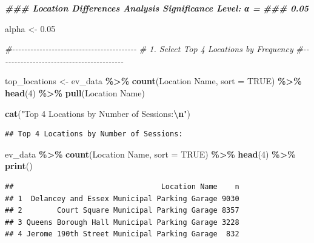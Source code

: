 \documentclass[
  12pt,
]{article}
\newenvironment{Shaded}{\begin{snugshade}}{\end{snugshade}}
\newcommand{\AttributeTok}[1]{\textcolor[rgb]{0.13,0.29,0.53}{#1}}
\newcommand{\CommentTok}[1]{\textcolor[rgb]{0.56,0.35,0.01}{\textit{#1}}}
\newcommand{\ConstantTok}[1]{\textcolor[rgb]{0.56,0.35,0.01}{#1}}
\newcommand{\DecValTok}[1]{\textcolor[rgb]{0.00,0.00,0.81}{#1}}
\newcommand{\DocumentationTok}[1]{\textcolor[rgb]{0.56,0.35,0.01}{\textbf{\textit{#1}}}}
\newcommand{\FloatTok}[1]{\textcolor[rgb]{0.00,0.00,0.81}{#1}}
\newcommand{\FunctionTok}[1]{\textcolor[rgb]{0.13,0.29,0.53}{\textbf{#1}}}
\newcommand{\NormalTok}[1]{#1}
\newcommand{\OtherTok}[1]{\textcolor[rgb]{0.56,0.35,0.01}{#1}}
\newcommand{\SpecialCharTok}[1]{\textcolor[rgb]{0.81,0.36,0.00}{\textbf{#1}}}
\newcommand{\StringTok}[1]{\textcolor[rgb]{0.31,0.60,0.02}{#1}}
\begin{document}
\begin{Shaded}
\begin{Highlighting}[]
\DocumentationTok{\#\#\# Location Differences Analysis Significance Level: α =}
\DocumentationTok{\#\#\# 0.05}

\NormalTok{alpha }\OtherTok{\textless{}{-}} \FloatTok{0.05}

\CommentTok{\#{-}{-}{-}{-}{-}{-}{-}{-}{-}{-}{-}{-}{-}{-}{-}{-}{-}{-}{-}{-}{-}{-}{-}{-}{-}{-}{-}{-}{-}{-}{-}{-}{-}{-}{-}{-}{-}{-}{-}{-}{-}}
\CommentTok{\# 1. Select Top 4 Locations by Frequency}
\CommentTok{\#{-}{-}{-}{-}{-}{-}{-}{-}{-}{-}{-}{-}{-}{-}{-}{-}{-}{-}{-}{-}{-}{-}{-}{-}{-}{-}{-}{-}{-}{-}{-}{-}{-}{-}{-}{-}{-}{-}{-}{-}{-}}

\NormalTok{top\_locations }\OtherTok{\textless{}{-}}\NormalTok{ ev\_data }\SpecialCharTok{\%\textgreater{}\%}
    \FunctionTok{count}\NormalTok{(}\StringTok{\textasciigrave{}}\AttributeTok{Location Name}\StringTok{\textasciigrave{}}\NormalTok{, }\AttributeTok{sort =} \ConstantTok{TRUE}\NormalTok{) }\SpecialCharTok{\%\textgreater{}\%}
    \FunctionTok{head}\NormalTok{(}\DecValTok{4}\NormalTok{) }\SpecialCharTok{\%\textgreater{}\%}
    \FunctionTok{pull}\NormalTok{(}\StringTok{\textasciigrave{}}\AttributeTok{Location Name}\StringTok{\textasciigrave{}}\NormalTok{)}

\FunctionTok{cat}\NormalTok{(}\StringTok{"Top 4 Locations by Number of Sessions:}\SpecialCharTok{\textbackslash{}n}\StringTok{"}\NormalTok{)}
\end{Highlighting}
\end{Shaded}

\begin{verbatim}
## Top 4 Locations by Number of Sessions:
\end{verbatim}

\begin{Shaded}
\begin{Highlighting}[]
\NormalTok{ev\_data }\SpecialCharTok{\%\textgreater{}\%}
    \FunctionTok{count}\NormalTok{(}\StringTok{\textasciigrave{}}\AttributeTok{Location Name}\StringTok{\textasciigrave{}}\NormalTok{, }\AttributeTok{sort =} \ConstantTok{TRUE}\NormalTok{) }\SpecialCharTok{\%\textgreater{}\%}
    \FunctionTok{head}\NormalTok{(}\DecValTok{4}\NormalTok{) }\SpecialCharTok{\%\textgreater{}\%}
    \FunctionTok{print}\NormalTok{()}
\end{Highlighting}
\end{Shaded}

\begin{verbatim}
##                                  Location Name    n
## 1  Delancey and Essex Municipal Parking Garage 9030
## 2        Court Square Municipal Parking Garage 8357
## 3 Queens Borough Hall Municipal Parking Garage 3228
## 4 Jerome 190th Street Municipal Parking Garage  832
\end{verbatim}
\end{document}
